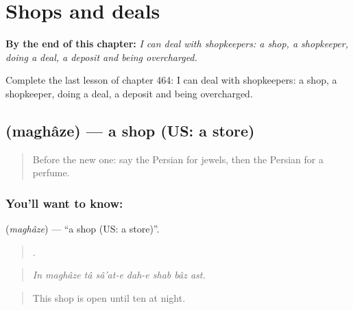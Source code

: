 
\chapter{Shops and deals}
\label{ch:fa-shops-and-deals}

\begin{chapteropening}
\textbf{By the end of this chapter:} \emph{I can deal with shopkeepers: a shop, a shopkeeper, doing a deal, a deposit and being overcharged.}

Complete the last lesson of chapter 464: I can deal with shopkeepers: a shop, a shopkeeper, doing a deal, a deposit and being overcharged.
\end{chapteropening}

\section[\texorpdfstring{\fa{مغازه} (maghâze)}{مغازه (maghâze)}]{ (maghâze) — a shop (US: a store)}

\label{lesson:FA-C464-maghaze}



\begin{quote}
Before the new one: say the Persian for jewels, then the Persian for a perfume.
\end{quote}

\subsection*{You'll want to know: }
\textbf{} (\emph{maghâze}) — \textquotedblleft{}a shop (US: a store)\textquotedblright{}.

\begin{quote}
       .
\end{quote}

\begin{quote}
\emph{In maghâze tâ sâ'at-e dah-e shab bâz ast.}
\end{quote}

\begin{quote}
This shop is open until ten at night.
\end{quote}

